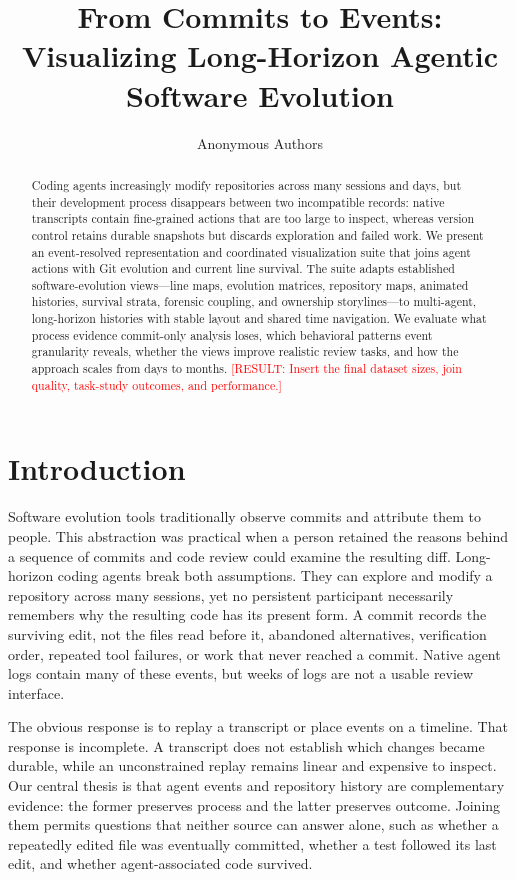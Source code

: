 \documentclass[10pt,twocolumn]{article}
\title{From Commits to Events: Visualizing Long-Horizon Agentic Software Evolution}
\author{Anonymous Authors}
\date{}
\newcommand{\result}[1]{\textcolor{red}{[RESULT: #1]}}
\begin{document}
\maketitle

\begin{abstract}
Coding agents increasingly modify repositories across many sessions and days,
but their development process disappears between two incompatible records:
native transcripts contain fine-grained actions that are too large to inspect,
whereas version control retains durable snapshots but discards exploration and
failed work. We present an event-resolved representation and coordinated
visualization suite that joins agent actions with Git evolution and current
line survival. The suite adapts established software-evolution views---line
maps, evolution matrices, repository maps, animated histories, survival
strata, forensic coupling, and ownership storylines---to multi-agent,
long-horizon histories with stable layout and shared time navigation. We
evaluate what process evidence commit-only analysis loses, which behavioral
patterns event granularity reveals, whether the views improve realistic review
tasks, and how the approach scales from days to months. \result{Insert the
final dataset sizes, join quality, task-study outcomes, and performance.}
\end{abstract}

\section{Introduction}
Software evolution tools traditionally observe commits and attribute them to
people. This abstraction was practical when a person retained the reasons
behind a sequence of commits and code review could examine the resulting diff.
Long-horizon coding agents break both assumptions. They can explore and modify
a repository across many sessions, yet no persistent participant necessarily
remembers why the resulting code has its present form. A commit records the
surviving edit, not the files read before it, abandoned alternatives,
verification order, repeated tool failures, or work that never reached a
commit. Native agent logs contain many of these events, but weeks of logs are
not a usable review interface.

The obvious response is to replay a transcript or place events on a timeline.
That response is incomplete. A transcript does not establish which changes
became durable, while an unconstrained replay remains linear and expensive to
inspect. Our central thesis is that agent events and repository history are
complementary evidence: the former preserves process and the latter preserves
outcome. Joining them permits questions that neither source can answer alone,
such as whether a repeatedly edited file was eventually committed, whether a
test followed its last edit, and whether agent-associated code survived.
\end{document}
